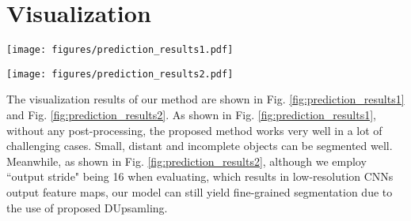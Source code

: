 \documentclass[10pt,twocolumn,letterpaper]{article}
\newcommand{\1}{{\mathbbm{1}}}
\begin{document}
\section{Visualization}
\begin{figure*}[!t]
  \centering
  \texttt{[image: figures/prediction\_results1.pdf]}
  \caption{Visualization results from {\it val} set. The proposed method works reliably in a lot of challenging cases including small, distant and incomplete objects.}
  \label{fig:prediction_results1}
\end{figure*}
\begin{figure*}[!t]
  \centering
  \texttt{[image: figures/prediction\_results2.pdf]}
  \caption{Visualization results from {\it val} set. The proposed method can yield fine-grained segmentation, with low-resolution CNNs output feature maps.}
  \label{fig:prediction_results2}
\end{figure*}
The visualization results of our method are shown in Fig. \ref{fig:prediction_results1} and Fig. \ref{fig:prediction_results2}.
As shown in Fig. \ref{fig:prediction_results1}, without any post-processing, the proposed method works very well in a lot of challenging cases. Small, distant and incomplete objects can be segmented well.
Meanwhile, as shown in Fig. \ref{fig:prediction_results2}, although we employ ``output stride" being 16 when evaluating, which results in low-resolution CNNs output feature maps, our model can still yield fine-grained segmentation due to the use of proposed DUpsamling.
 
\end{document}
